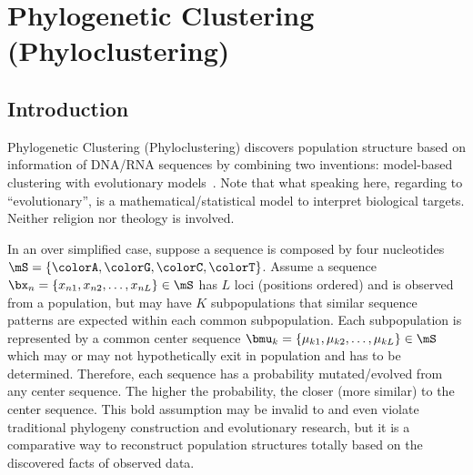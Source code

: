 
\chapter{Phylogenetic Clustering (Phyloclustering)}
\label{chp:phyloclustering}




\section{Introduction}

Phylogenetic Clustering (Phyloclustering)
discovers population structure based on information of DNA/RNA sequences
by combining two inventions: model-based clustering with evolutionary
models~\citep{Chen2011a}.
Note that what speaking here, regarding to ``evolutionary'',
is a mathematical/statistical model to interpret biological targets.
Neither religion nor theology is involved. 

In an over simplified case, suppose a sequence is composed by four nucleotides
$\mS = \{\colorA, \colorG, \colorC, \colorT\}$.
Assume a sequence
$\bx_n = \{x_{n1}, x_{n2},\ldots, x_{nL}\} \in \mS$
has $L$ loci (positions ordered) and is observed from a population, but
may have $K$ subpopulations that similar sequence patterns are expected
within each common subpopulation.
Each subpopulation is represented by a common center sequence
$\bmu_k = \{\mu_{k1}, \mu_{k2},\ldots, \mu_{kL}\} \in \mS$
which may or may not hypothetically exit in population and has to be
determined.
Therefore, each sequence has a probability mutated/evolved from any
center sequence. The higher the probability, the closer (more similar)
to the center sequence. This bold assumption may be invalid to and even violate
traditional phylogeny construction and evolutionary research, but it is
a comparative way to reconstruct population structures totally
based on the discovered facts of observed data.

